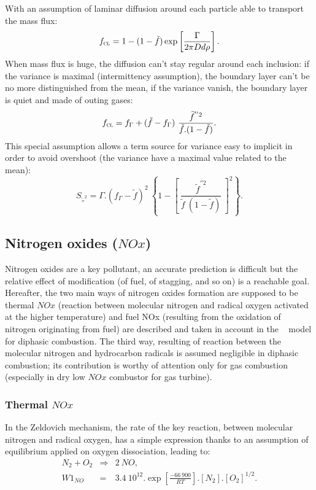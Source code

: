 With an assumption of laminar diffusion around each particle able to transport
the mass flux:
\begin{equation*}
\displaystyle f_{\mbox{\scriptsize\textsc{cl}}} =  1 - (1-\tilde f)\exp \left[\displaystyle \frac{\Gamma}{2 \pi D d \rho}\right].
\end{equation*}
When mass flux is huge, the diffusion can't stay regular around each inclusion:
if the variance is maximal (intermittency assumption), the boundary layer can't
be no more distinguished from the mean, if the variance vanish, the boundary
layer is quiet and made of outing gases:
\begin{equation*}
\displaystyle f_{\mbox{\scriptsize\textsc{cl}}} = f_{\Gamma} + (\tilde f  - f_{\Gamma}) ~ \frac{\widetilde f^{''2}}{\tilde f .(1-\tilde f)}.
\end{equation*}
This special assumption allows a term source for variance easy to implicit in order to avoid overshoot (the variance have a maximal value related to the mean):
\begin{equation*}
\displaystyle S_{\widetilde ''^{2}} = \Gamma .\left( f_{\Gamma}-\tilde f\right)^{2} ~ \left\{ 1-\left[~ \frac{\widetilde f^{''2}}{\tilde f ~(1-\tilde f)}~\right]^{\textstyle2}\right\} .
\end{equation*}


\subsection{Nitrogen oxides ($NOx$)}

Nitrogen oxides are a key pollutant, an accurate prediction is difficult but the
relative effect of modification (of fuel, of stagging, and so on) is a reachable
goal.
Hereafter, the two main ways of nitrogen oxides formation are supposed to
be thermal $NOx$ (reaction between molecular nitrogen and radical oxygen activated
at the higher temperature) and fuel NOx (resulting from the oxidation of
nitrogen originating from fuel) are described and taken in account in the \CS~
model for diphasic combustion. The third way, resulting of reaction between the
molecular nitrogen and hydrocarbon radicals is assumed negligible in diphasic
combustion; its contribution is worthy of attention only for gas combustion
(especially in dry
low $NOx$ combustor for gas turbine).

\subsubsection{Thermal $NOx$}
In the Zeldovich mechanism, the rate of the key reaction, between molecular
nitrogen and radical oxygen, has a simple expression thanks to an assumption of
equilibrium applied on oxygen dissociation, leading to:
\begin{eqnarray*}
 N_{2} + O_{2} &\Rightarrow& 2 ~NO , \\
 W1_{NO}&=& 3.4\medspace10^{12}  .   \exp \left[\frac{-66\medspace900}{RT}\right].\left[ N_{2} \right] . \left[O_{2}\right]^{1/2} .
\end{eqnarray*}

